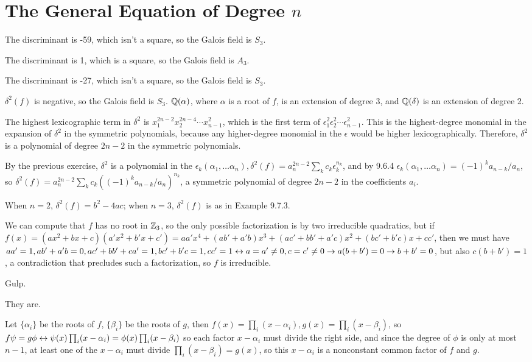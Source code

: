 \documentclass[11pt, oneside]{article}   	%
\begin{document}
\section{The General Equation of Degree $n$}
\be
\item \be
\item The discriminant is -59, which isn't a square, so the Galois field is $S_3$.
\item The discriminant is 1, which is a square, so the Galois field is $A_3$.
\item The discriminant is -27, which isn't a square, so the Galois field is $S_3$.
\ee
\item $\delta^2(f)$ is negative, so the Galois field is $S_3$. $\mathbb{Q}(\alpha)$, where $\alpha$ is a root of $f$, is an extension of degree 3, and $\mathbb{Q}(\delta)$ is an extension of degree 2.
\item The highest lexicographic term in $\delta^2$ is $x_1^{2n-2}x_2^{2n-4}\cdots x_{n-1}^2$, which is the first term of $\epsilon_1^2\epsilon_2^2\cdots \epsilon_{n-1}^2$. This is the highest-degree monomial in the expansion of $\delta^2$ in the symmetric polynomials, because any higher-degree monomial in the $\epsilon$ would be higher lexicographically. Therefore, $\delta^2$ is a polynomial of degree $2n-2$ in the symmetric polynomials.
\item By the previous exercise, $\delta^2$ is a polynomial in the $\epsilon_k(\alpha_1, \ldots \alpha_n), \delta^2(f) = a_n^{2n-2}\sum_kc_k\epsilon_k^{n_k}$, and by 9.6.4 $\epsilon_k(\alpha_1, \ldots \alpha_n) = (-1)^ka_{n-k}/a_n$, so $\delta^2(f) = a_n^{2n-2}\sum_kc_k((-1)^ka_{n-k}/a_n)^{n_k}$, a symmetric polynomial of degree $2n-2$ in the coefficients $a_i$.
\item When $n=2$, $\delta^2(f) = b^2 - 4ac$; when $n=3$, $\delta^2(f)$ is as in Example 9.7.3.
\item We can compute that $f$ has no root in $\mathbb{Z}_3$, so the only possible factorization is by two irreducible quadratics, but if $f(x) = (ax^2 + bx + c)(a'x^2 + b'x + c') = aa'x^4 + (ab' + a'b)x^3 + (ac' + bb' + a'c)x^2 + (bc' + b'c)x + cc'$, then we must have $aa' = 1, ab' + a'b = 0, ac' + bb' + ca' = 1, bc' + b'c = 1, cc' = 1 \leftrightarrow a=a' \not = 0, c = c' \not = 0 \rightarrow a(b + b') = 0 \rightarrow b + b' = 0$, but also $c(b + b') = 1$, a contradiction that precludes such a factorization, so $f$ is irreducible.
\item Gulp.
\item They are.
\item Let $\{\alpha_i\}$ be the roots of $f$, $\{\beta_i\}$ be the roots of $g$, then $f(x) = \prod_i(x-\alpha_i), g(x) = \prod_i(x-\beta_i)$, so $f\psi = g\phi \leftrightarrow \psi(x)\prod_i(x-\alpha_i) = \phi(x)\prod_i(x-\beta_i)$ so each factor $x-\alpha_i$ must divide the right side, and since the degree of $\phi$ is only at most $n-1$, at least one of the $x-\alpha_i$ must divide $\prod_i(x-\beta_i) = g(x)$, so this $x-\alpha_i$ is a nonconstant common factor of $f$ and $g$.
\end{document}
